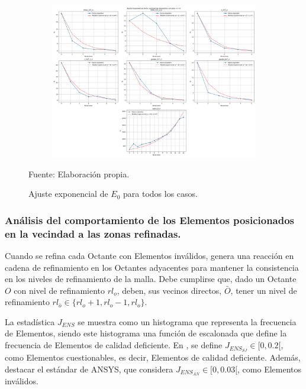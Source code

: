 \begin{itemize}
	\begin{figure}[!ht]
		\centering
		\begin{subfigure}[t]{1.0\textwidth}
			\includegraphics[width=0.75\paperheight, angle=90, origin=c]{figures/analysis/fit_all.png}
		\end{subfigure}
		\caption{ Ajuste exponencial de $E_0$ para todos los casos. }
		Fuente: Elaboración propia.
		\label{fig:exponential_fit_all}
	\end{figure}

\end{itemize}


\subsubsection{ Análisis del comportamiento de los Elementos posicionados en la vecindad a las zonas refinadas.}

Cuando se refina cada Octante con Elementos inválidos, genera una reacción en cadena de refinamiento en los Octantes adyacentes para mantener la consistencia en los niveles de refinamiento de la malla. Debe cumplirse que, dado un Octante $O$ con nivel de refinamiento $rl_o$, deben, sus vecinos directos, $\bar{O}$, tener un nivel de refinamiento $rl_{\bar{o}} \in \{rl_o + 1, rl_o - 1, rl_o\}$.



La estadística $J_{ENS}$ se muestra como un histograma que representa la frecuencia de Elementos, siendo este histograma una función de escalonada que define la frecuencia de Elementos de calidad deficiente. En \cite{shepherd-2008}, se define $J_{ENS_{SJ}} \in [0, 0.2[$, como Elementos cuestionables, es decir, Elementos de calidad deficiente. Además, destacar el estándar de ANSYS, que considera $J_{ENS_{AN}} \in [0, 0.03[$, como Elementos inválidos.


